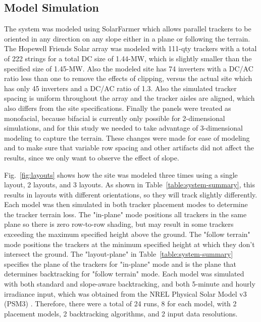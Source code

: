 \documentclass[conference]{IEEEtran}
\begin{document}
\subsection{Model Simulation}

The system was modeled using SolarFarmer \cite{Mikofski_8547323} which allows parallel trackers to be oriented in any direction on any slope either in a plane or following the terrain. The Hopewell Friends Solar array was modeled with 111-qty trackers with a total of 222 strings for a total DC size of 1.44-MW, which is slightly smaller than the specified size of 1.45-MW. Also the modeled site has 74 inverters with a DC/AC ratio less than one to remove the effects of clipping, versus the actual site which has only 45 inverters and a DC/AC ratio of 1.3. Also the simulated tracker spacing is uniform throughout the array and the tracker aisles are aligned, which also differs from the site specifications. Finally the panels were treated as monofacial, because bifacial is currently only possible for 2-dimensional simulations, and for this study we needed to take advantage of 3-dimensional modeling to capture the terrain. These changes were made for ease of modeling and to make sure that variable row spacing and other artifacts did not affect the results, since we only want to observe the effect of slope.

Fig.~\ref{fig:layouts} shows how the site was modeled three times using a single layout, 2 layouts, and 3 layouts. As shown in Table~\ref{table:system-summary}, this results in layouts with different orientations, so they will track slightly differently. Each model was then simulated in both tracker placement modes to determine the tracker terrain loss. The "in-plane" mode positions all trackers in the same plane so there is zero row-to-row shading, but may result in some trackers exceeding the maximum specified height above the ground. The "follow terrain" mode positions the trackers at the minimum specified height at which they don't intersect the ground. The "layout-plane" in Table~\ref{table:system-summary} specifies the plane of the trackers for "in-plane" mode and is the plane that determines backtracking for "follow terrain" mode. Each model was simulated with both standard \cite{Marion2013} and slope-aware \cite{Anderson2020} backtracking, and both 5-minute and hourly irradiance input, which was obtained from the NREL Physical Solar Model v3 (PSM3) \cite{Sengupta2018}. Therefore, there were a total of 24 runs, 8 for each model, with 2 placement models, 2 backtracking algorithms, and 2 input data resolutions.
\end{document}
